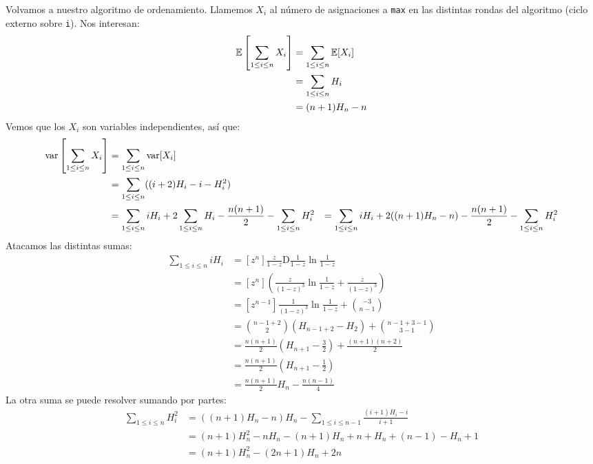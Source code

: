   Volvamos a nuestro algoritmo de ordenamiento.
  Llamemos \(X_i\) al número de asignaciones a \lstinline[language = C]!max!
  en las distintas rondas del algoritmo
  (ciclo externo sobre \lstinline[language = C]!i!).
  Nos interesan:
  \begin{align}
    \operatorname{\mathbb{E}}\left[ \sum_{1 \le i \le n} X_i \right]
      &= \sum_{1 \le i \le n} \operatorname{\mathbb{E}}[ X_i ] \notag \\
      &= \sum_{1 \le i \le n} H_i \notag \\
      &= (n + 1) H_n - n
  \end{align}
  Vemos que los \(X_i\) son variables independientes,
  así que:
  \begin{align*}
    \operatorname{var}\left[ \sum_{1 \le i \le n} X_i \right]
      &= \sum_{1 \le i \le n} \operatorname{var}[ X_i ] \\
      &= \sum_{1 \le i \le n} ((i + 2) H_i - i - H_i^2) \\
      &= \sum_{1 \le i \le n} i H_i
           + 2 \sum_{1 \le i \le n} H_i
           - \frac{n (n + 1)}{2}
           - \sum_{1 \le i \le n} H_i^2
      &= \sum_{1 \le i \le n} i H_i
           + 2 ((n + 1) H_n - n)
           - \frac{n (n + 1)}{2}
           - \sum_{1 \le i \le n} H_i^2
  \end{align*}
  Atacamos las distintas sumas:
  \begin{align*}
    \sum_{1 \le i \le n} i H_i
      &= [z^n]
           \frac{z}{1 - z} \mathrm{D} \frac{1}{1 - z} \ln \frac{1}{1 - z} \\
      &= [z^n] \left(
                 \frac{z}{(1 - z)^3} \ln \frac{1}{1 - z}
                   + \frac{z}{(1 - z)^3}
               \right) \\
      &= [z^{n - 1}] \frac{1}{(1 - z)^3} \ln \frac{1}{1 - z}
          + \binom{-3}{n - 1} \\
      &= \binom{n - 1 + 2}{2} (H_{n - 1 + 2} - H_2)
           + \binom{n - 1 + 3 - 1}{3 - 1} \\
      &= \frac{n (n + 1)}{2} \left( H_{n + 1} - \frac{3}{2} \right)
           + \frac{(n + 1) (n + 2)}{2} \\
      &= \frac{n (n + 1)}{2} \left( H_{n + 1} - \frac{1}{2} \right) \\
      &= \frac{n (n + 1)}{2} H_n - \frac{n (n - 1)}{4}
  \end{align*}
  La otra suma se puede resolver sumando por partes:
  \begin{align*}
    \sum_{1 \le i \le n} H_i^2
      &= ((n + 1) H_n - n) H_n
           - \sum_{1 \le i \le n - 1} \frac{(i + 1) H_i - i}{i + 1} \\
      &= (n + 1) H_n^2 - n H_n
          - (n + 1) H_n + n + H_n + (n - 1) - H_n + 1 \\
      &= (n + 1) H_n^2 - (2 n + 1) H_n + 2 n
  \end{align*}
